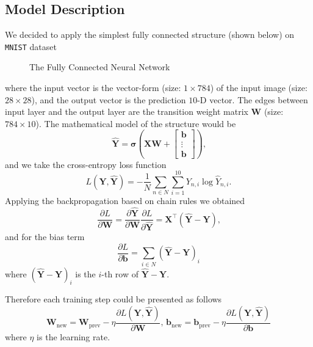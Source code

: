 \documentclass[10pt]{article}
\begin{document}
\subsection{Model Description}
We decided to apply the simplest fully connected structure (shown below) on \texttt{MNIST} dataset
\begin{figure}[H]
\centering
{}
\caption{The Fully Connected Neural Network}
\end{figure}
where the input vector is the vector-form (size: $1\times784$) of the input image (size: $28\times28$), and the output vector is the prediction $10$-D vector. The edges between input layer and the output layer are the transition weight matrix $\mathbf{W}$ (size: $784\times10$). The mathematical model of the structure would be
$$\hat{\mathbf{Y}} = \boldsymbol{\sigma}\left(\mathbf{X}\mathbf{W} + \begin{bmatrix}\mathbf{b} \\
\vdots \\
\mathbf{b}
\end{bmatrix}\right)\text{,}$$
and we take the cross-entropy loss function
$$L\left(\mathbf{Y}, \hat{\mathbf{Y}}\right) = -\frac1N\sum\limits_{n \in N}\sum\limits_{i = 1}^{10}Y_{n,i}\log\hat{Y}_{n,i}\text{.}$$
Applying the backpropagation \cite{rumelhart1988learning} based on chain rules we obtained
$$\frac{\partial L}{\partial\mathbf{W}} = \frac{\partial\hat{\mathbf{Y}}}{\partial \mathbf{W}}\frac{\partial L}{\partial\hat{\mathbf{Y}}} = \mathbf{X}^{\intercal}\left(\hat{\mathbf{Y}} - \mathbf{Y}\right)\text{,}$$
and for the bias term
$$\frac{\partial L}{\partial\mathbf{b}} = \sum\limits_{i \in N}\left(\hat{\mathbf{Y}} - \mathbf{Y}\right)_i$$
where $\left(\hat{\mathbf{Y}} - \mathbf{Y}\right)_i$ is the $i$-th row of $\hat{\mathbf{Y}} - \mathbf{Y}$.\par
Therefore each training step could be presented as follows
$$\mathbf{W}_{\text{new}} = \mathbf{W}_{\text{prev}} - \eta\frac{\partial L\left(\mathbf{Y}, \hat{\mathbf{Y}}\right)}{\partial\mathbf{W}},\, \mathbf{b}_{\text{new}} = \mathbf{b}_{\text{prev}} - \eta\frac{\partial L\left(\mathbf{Y}, \hat{\mathbf{Y}}\right)}{\partial\mathbf{b}}$$
where $\eta$ is the learning rate.
\end{document}
